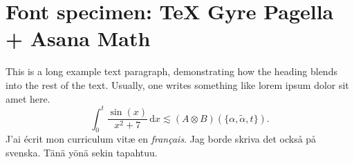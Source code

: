 \documentclass[11pt]{report}
\begin{document}
\section*{Font specimen: \TeX{} Gyre Pagella + Asana Math}
This is a long example text paragraph,
demonstrating how the heading blends into the rest of the text.
Usually, one writes something like lorem ipsum dolor sit amet here.
\[
\int_0^t \frac{\sin(x)}{x^2 + 7} \,\mathrm dx
\lesssim (A \otimes B)(\{ \alpha, \tilde\alpha, t \}).
\]
J'ai écrit mon curriculum vit\ae{} en \emph{fran\c{c}ais}.
Jag borde skriva det också på svenska.
Tänä yönä sekin tapahtuu.
\end{document}
